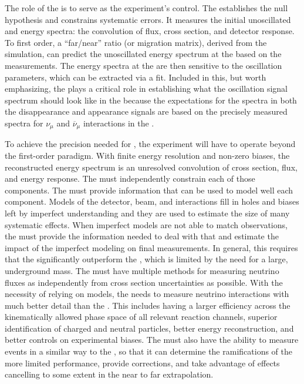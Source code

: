 The role of the  is to serve as the experiment's control. The  establishes the null hypothesis and constrains systematic errors. It measures the initial unoscillated \numu and \nue energy spectra: the convolution of flux, cross section, and detector response. To first order, a ``far/near'' ratio (or migration matrix), derived from the simulation, can predict the unoscillated energy spectrum at the  based on the  measurements.  The energy spectra at the  are then sensitive to the oscillation parameters, which can be extracted via a fit.  Included in this, but worth emphasizing, the  plays a critical role in establishing what the oscillation signal spectrum should look like in the  because the expectations for the spectra in both the disappearance and appearance signals are based on the precisely measured spectra for $\nu_{\mu}$ and $\overline{\nu}_{\mu}$ interactions in the .

To achieve the precision needed for , the experiment will have to operate beyond the first-order paradigm. With finite energy resolution and non-zero biases, the reconstructed energy spectrum is an unresolved convolution of cross section, flux, and energy response. The  must independently constrain each of those components.  The  must provide information that can be used to model well each component. Models of the detector, beam, and interactions fill in holes and biases left by imperfect understanding and they are used to estimate the size of many systematic effects.  When imperfect models are not able to match observations, the  must provide the information needed to deal with that and estimate the impact of the imperfect modeling on final measurements. In general, this requires that the  significantly outperform the , which is limited by the need for a large, underground mass. The  must have multiple methods for measuring neutrino fluxes as independently from cross section uncertainties as possible. With the necessity of relying on models, the  needs to measure neutrino interactions with much better detail than the . This includes having a larger efficiency across the kinematically allowed phase space of all relevant reaction channels, superior identification of charged and neutral particles, better energy reconstruction, and better controls on experimental biases. The  must also have the ability to measure events in a similar way to the , so that it can determine the ramifications of the more limited  performance, provide corrections, and take advantage of effects cancelling to some extent in the near to far extrapolation.

